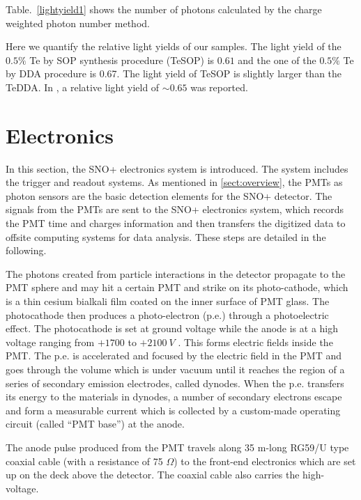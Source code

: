 Table.~\ref{lightyield1} shows the number of photons calculated by the charge weighted photon number method.

Here we quantify the relative light yields of our samples. The light yield of the $0.5\%$ Te by SOP synthesis procedure (TeSOP) is $0.61$ and the one of the $0.5\%$ Te by DDA procedure is 0.67. The light yield of TeSOP is slightly larger than the TeDDA. In \cite{biller2017new}, a relative light yield of $\sim 0.65$ was reported.

\section{Electronics}
In this section, the SNO+ electronics system is introduced. The system includes the trigger and readout systems. As mentioned in \ref{sect:overview}, the PMTs as photon sensors are the basic detection elements for the SNO+ detector. The signals from the PMTs are sent to the SNO+ electronics system, which records the PMT time and charges information and then transfers the digitized data to offsite computing systems for data analysis. These steps are detailed in the following.

The photons created from particle interactions in the detector propagate to the PMT sphere and may hit a certain PMT and strike on its photo-cathode, which is a thin cesium bialkali film coated on the inner surface of PMT glass. The photocathode then produces a photo-electron (p.e.) through a photoelectric effect. The photocathode is set at ground voltage while the anode is at a high voltage ranging from $+1700$ to $+2100~V$ \cite{boger2000sudbury,dunger2018topological}. This forms electric fields inside the PMT. The p.e. is accelerated and focused by the electric field in the PMT and goes through the volume which is under vacuum until it reaches the region of a series of secondary emission electrodes, called dynodes. When the p.e. transfers its energy to the materials in dynodes, a number of secondary electrons escape and form a measurable current which is collected by a custom-made operating circuit (called ``PMT base'') at the anode\cite{hamamatsu2018photomultiplier}.

The anode pulse produced from the PMT travels along 35 m-long RG59/U type coaxial cable (with a resistance of 75 $\Omega$) to the front-end electronics which are set up on the deck above the detector. The coaxial cable also carries the high-voltage\cite{boger2000sudbury}. 

